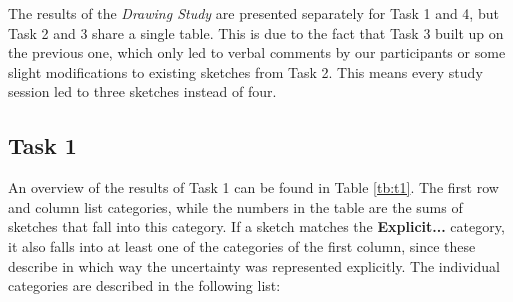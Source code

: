 The results of the \textit{Drawing Study} are presented separately for Task 1 and 4, but Task 2 and 3 share a single table. This is due to the fact that Task 3 built up on the previous one, which only led to verbal comments by our participants or some slight modifications to existing sketches from Task 2. This means every study session led to three sketches instead of four.

\subsection*{Task 1}
An overview of the results of Task 1 can be found in Table \ref{tb:t1}. The first row and column list categories, while the numbers in the table are the sums of sketches that fall into this category. If a sketch matches the \textbf{Explicit...} category, it also falls into at least one of the categories of the first column, since these describe in which way the uncertainty was represented explicitly. The individual categories are described in the following list:

